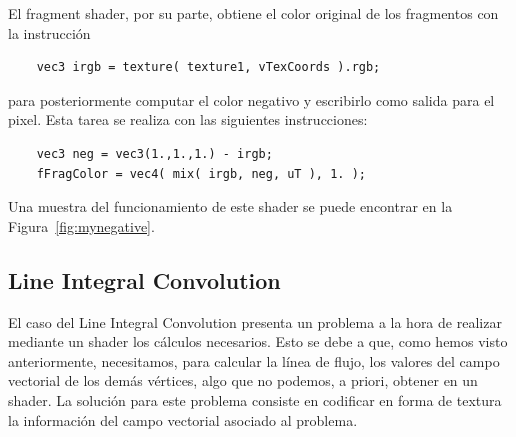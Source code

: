 El fragment shader, por su parte, obtiene el color original de los fragmentos
con la instrucción

\begin{verbatim}
    vec3 irgb = texture( texture1, vTexCoords ).rgb;
\end{verbatim}
para posteriormente computar el color negativo y escribirlo como salida para el
pixel. Esta tarea se realiza con las siguientes instrucciones:

\begin{verbatim}
    vec3 neg = vec3(1.,1.,1.) - irgb;
    fFragColor = vec4( mix( irgb, neg, uT ), 1. );
\end{verbatim}

Una muestra del funcionamiento de este shader se puede encontrar en la
Figura~\ref{fig:mynegative}.

\subsection{Line Integral Convolution}
\label{makereference5.5.8}

El caso del Line Integral Convolution presenta un problema a la hora de realizar
mediante un shader los cálculos necesarios. Esto se debe a que, como hemos visto
anteriormente, necesitamos, para calcular la línea de flujo, los valores del
campo vectorial de los demás vértices, algo que no podemos, a priori, obtener en
un shader. La solución para este problema consiste en codificar en forma de
textura la información del campo vectorial asociado al problema. 


